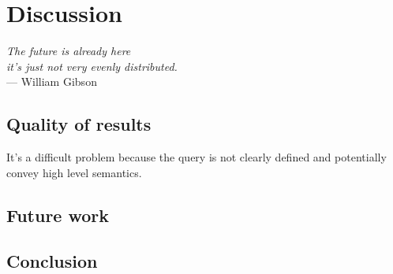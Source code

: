 \chapter{Discussion}
\label{chap:discussion}

\begin{flushright}{\slshape    
		The future is already here \\
		it's just not very evenly distributed.
    } \\ \medskip
    --- William Gibson
\end{flushright}

\section{Quality of results}

It's a difficult problem because the query is not clearly defined and
potentially convey high level semantics.

\section{Future work}

\section{Conclusion}
